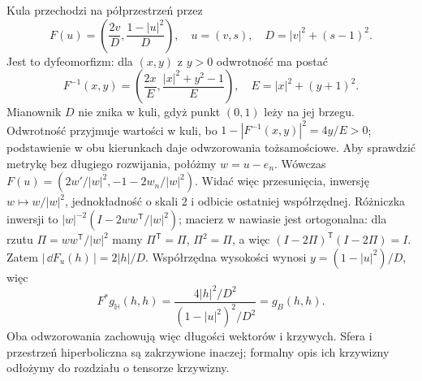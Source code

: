 \begin{przyklad}
Kula przechodzi na półprzestrzeń przez
\[
 F(u)=\left(\frac{2v}{D},\frac{1-|u|^2}{D}\right),
 \quad u=(v,s),\quad D=|v|^2+(s-1)^2.
\]
Jest to dyfeomorfizm: dla $(x,y)$ z $y>0$
odwrotność ma postać
\[
 F^{-1}(x,y)=
 \left(\frac{2x}{E},
       \frac{|x|^2+y^2-1}{E}\right),
 \quad E=|x|^2+(y+1)^2.
\]
Mianownik $D$ nie znika w kuli, gdyż punkt $(0,1)$
leży na jej brzegu. Odwrotność przyjmuje wartości w kuli,
bo $1-|F^{-1}(x,y)|^2=4y/E>0$; podstawienie w obu
kierunkach daje odwzorowania tożsamościowe.
Aby sprawdzić metrykę bez długiego rozwijania,
połóżmy $w=u-e_n$. Wówczas
$F(u)=(2w'/|w|^2,-1-2w_n/|w|^2)$.
Widać więc przesunięcia, inwersję
$w\mapsto w/|w|^2$, jednokładność o skali $2$
i odbicie ostatniej współrzędnej. Różniczka inwersji to
$|w|^{-2}(I-2ww^{\mathsf T}/|w|^2)$;
macierz w nawiasie jest ortogonalna: dla rzutu
$\Pi=ww^{\mathsf T}/|w|^2$ mamy
$\Pi^{\mathsf T}=\Pi$, $\Pi^2=\Pi$, a więc
$(I-2\Pi)^{\mathsf T}(I-2\Pi)=I$.
Zatem $|\,\dd F_u(h)\,|=2|h|/D$.
Współrzędna wysokości wynosi
$y=(1-|u|^2)/D$, więc
\[
 F^*g_{\mathbb H}(h,h)
 =\frac{4|h|^2/D^2}{(1-|u|^2)^2/D^2}
 =g_B(h,h).
\]
Oba odwzorowania zachowują więc długości
wektorów i krzywych. Sfera i przestrzeń
hiperboliczna są zakrzywione inaczej;
formalny opis ich krzywizny odłożymy do
rozdziału o tensorze krzywizny.
\end{przyklad}

